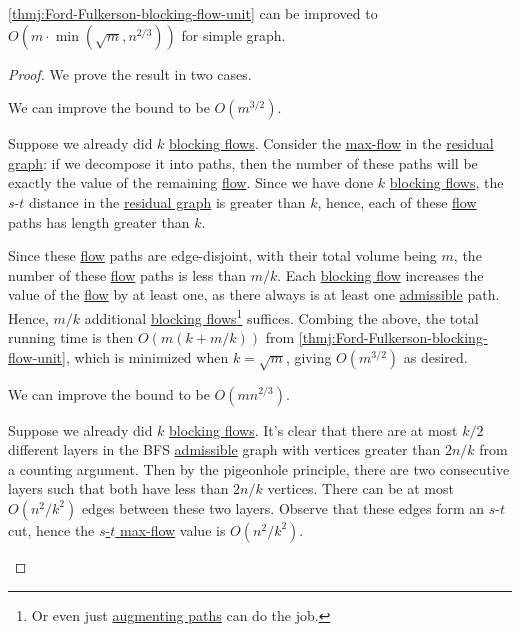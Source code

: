 \begin{corollary}\label{col:Ford-Fulkerson-blocking-flow-unit}
	\autoref{thmj:Ford-Fulkerson-blocking-flow-unit} can be improved to \(O(m \cdot \min (\sqrt{m} , n^{2 / 3}))\) for simple graph.
\end{corollary}
\begin{proof}
	We prove the result in two cases.

	\begin{claim}
		We can improve the bound to be \(O(m^{3 / 2})\).
	\end{claim}
	\begin{explanation}
		Suppose we already did \(k\) \hyperref[def:blocking-flow]{blocking flows}. Consider the \hyperref[prb:s-t-max-flow]{max-flow} in the \hyperref[def:residual-graph]{residual graph}: if we decompose it into paths, then the number of these paths will be exactly the value of the remaining \hyperref[def:flow]{flow}. Since we have done \(k\) \hyperref[def:blocking-flow]{blocking flows}, the \(s\)-\(t\) distance in the \hyperref[def:residual-graph]{residual graph} is greater than \(k\), hence, each of these \hyperref[def:flow]{flow} paths has length greater than \(k\).

		Since these \hyperref[def:flow]{flow} paths are edge-disjoint, with their total volume being \(m\), the number of these \hyperref[def:flow]{flow} paths is less than \(m / k\). Each \hyperref[def:blocking-flow]{blocking flow} increases the value of the \hyperref[def:flow]{flow} by at least one, as there always is at least one \hyperref[def:admissible]{admissible} path. Hence, \(m / k\) additional \hyperref[def:blocking-flow]{blocking flows}\footnote{Or even just \hyperref[def:augmenting-path]{augmenting paths} can do the job.} suffices. Combing the above, the total running time is then \(O(m (k + m / k))\) from \autoref{thmj:Ford-Fulkerson-blocking-flow-unit}, which is minimized when \(k = \sqrt{m} \), giving \(O(m^{3 / 2})\) as desired.
	\end{explanation}

	\begin{claim}
		We can improve the bound to be \(O(mn^{2 / 3})\).
	\end{claim}
	\begin{explanation}
		Suppose we already did \(k\) \hyperref[def:blocking-flow]{blocking flows}. It's clear that there are at most \(k / 2\) different layers in the BFS \hyperref[def:admissible]{admissible} graph with vertices greater than \(2n / k\) from a counting argument. Then by the pigeonhole principle, there are two consecutive layers such that both have less than \(2n / k\) vertices. There can be at most \(O(n^2 / k^2)\) edges between these two layers. Observe that these edges form an \(s\)-\(t\) cut, hence the \hyperref[prb:s-t-max-flow]{\(s\)-\(t\) max-flow} value is \(O(n^2 / k^2)\).


\end{explanation}
\end{proof}
